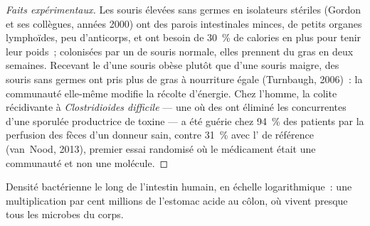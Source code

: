 \begin{proof}[Faits expérimentaux]
Les souris élevées sans germes en isolateurs stériles (Gordon et ses
collègues, années 2000) ont des parois intestinales minces, de petits
organes lymphoïdes, peu d'anticorps, et ont besoin de \qty{30}{\%} de
calories en plus pour tenir leur poids~; colonisées par un 
de souris normale, elles prennent du gras en deux semaines. Recevant le
 d'une souris obèse plutôt que d'une souris maigre, des
souris sans germes ont pris plus de gras à nourriture égale
(Turnbaugh, 2006)~: la communauté elle-même modifie la récolte
d'énergie. Chez l'homme, la colite récidivante à
\emph{Clostridioides difficile} --- une  où des 
ont éliminé les concurrentes d'une sporulée productrice de toxine ---
a été guérie chez \qty{94}{\%} des patients par la perfusion des fèces
d'un donneur sain, contre \qty{31}{\%} avec l' de référence
(van~Nood, 2013), premier essai randomisé où le médicament était une
communauté et non une molécule.
\end{proof}

\begin{omfigure}

{\small Densité bactérienne le long de l'intestin humain, en échelle
logarithmique~: une multiplication par cent millions de l'estomac acide
au côlon, où vivent presque tous les microbes du corps.}
\end{omfigure}

